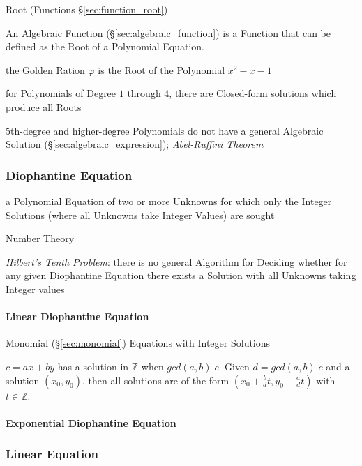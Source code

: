 \fist Root (Functions \S\ref{sec:function_root})

An Algebraic Function (\S\ref{sec:algebraic_function}) is a Function that can
be defined as the Root of a Polynomial Equation.

the Golden Ration $\varphi$ is the Root of the Polynomial $x^2 - x - 1$

for Polynomials of Degree $1$ through $4$, there are Closed-form solutions
which produce all Roots

$5$th-degree and higher-degree Polynomials do not have a general Algebraic
Solution (\S\ref{sec:algebraic_expression}); \emph{Abel-Ruffini Theorem}



\subsubsection{Diophantine Equation}\label{sec:diophantine_equation}

a Polynomial Equation of two or more Unknowns for which only the Integer
Solutions (where all Unknowns take Integer Values) are sought

\fist Number Theory

\emph{Hilbert's Tenth Problem}: there is no general Algorithm for Deciding
whether for any given Diophantine Equation there exists a Solution with all
Unknowns taking Integer values



\paragraph{Linear Diophantine Equation}
\label{sec:linear_diophantine}\hfill

Monomial (\S\ref{sec:monomial}) Equations with Integer Solutions

$c = ax + by$ has a solution in $\mathbb{Z}$ when $gcd(a,b)|c$. Given
$d=gcd(a,b)|c$ and a solution $(x_0, y_0)$, then all solutions are of
the form $(x_0 + \frac{b}{d}t, y_0 - \frac{a}{d}t)$ with $t \in
\mathbb{Z}$.



\paragraph{Exponential Diophantine Equation}\hfill
\label{sec:exponential_diophantine}



\subsubsection{Linear Equation}\label{sec:linear_equation}

